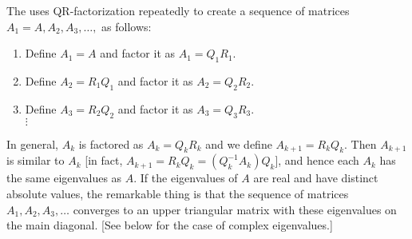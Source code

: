 \documentclass{ximera}
\begin{document}
The  uses QR-factorization repeatedly to create a sequence of matrices $A_{1} =A, A_{2}, A_{3}, \dots,$ as follows:

\begin{enumerate}
\item Define $A_{1} = A$ and factor it as $A_{1} = Q_{1}R_{1}$.

\item Define $A_{2} = R_{1}Q_{1}$ and factor it as $A_{2} = Q_{2}R_{2}$.

\item Define $A_{3} = R_{2}Q_{2}$ and factor it as $A_{3} = Q_{3}R_{3}$.
\\ \hspace*{4em} $\vdots$


\end{enumerate}

In general, $A_{k}$ is factored as $A_{k} = Q_{k}R_{k}$ and we define $A_{k + 1} = R_{k}Q_{k}$. Then $A_{k + 1}$ is similar to $A_{k}$ [in fact, $A_{k+1} = R_{k}Q_{k} = (Q_{k}^{-1}A_{k})Q_{k}$], and hence each $A_{k}$ has the same eigenvalues as $A$. If the eigenvalues of $A$ are real and have distinct absolute values, the remarkable thing is that the sequence of matrices $A_{1}, A_{2}, A_{3}, \dots$ converges to an upper triangular matrix with these eigenvalues on the main diagonal. [See below for the case of complex eigenvalues.]
\end{document}
